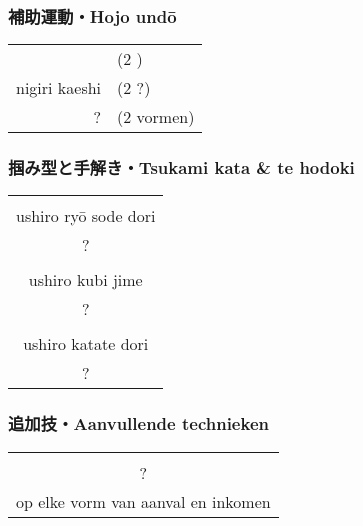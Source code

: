 \subsubsection{補助運動・Hojo und\={o}}
\begin{table}[H]
\begin{center}
\begin{tabular}{rl}
    \ruby{}{} & (2 \ruby{}{})\\
    nigiri kaeshi & (2 ?)\\
    ? & (2 vormen)
\end{tabular}
\end{center}
\label{kyuu_2_hojo_undou}
\end{table}

\subsubsection{掴み型と手解き・Tsukami kata \& te hodoki}
\begin{table}[H]
\begin{center}
\begin{tabular}{c}
    \ruby{}{}\ruby{}{}\\
    ushiro ry\={o} sode dori\\
    ?\\
    \hline
    \ruby{}{}\\
    ushiro kubi jime\\
    ?\\
    \hline
    \ruby{}{}\\
    ushiro katate dori\\
    ?
\end{tabular}
\end{center}
\label{kyuu_2_te_hodoki}
\end{table}

\subsubsection{追加技・Aanvullende technieken}
\begin{table}[H]
\begin{center}
\begin{tabular}{c}
    \ruby{}{}\\
    ?\\
    op elke vorm van aanval en inkomen
\end{tabular}
\end{center}
\label{kyuu_2_additional}
\end{table}

